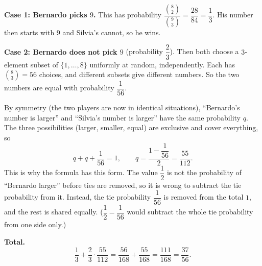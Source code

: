 \textbf{Case 1: Bernardo picks $9$.} This has probability $\dfrac{\binom82}{\binom93}=\dfrac{28}{84}=\dfrac{1}{3}$. His number then starts with $9$ and Silvia's cannot, so he wins.

\textbf{Case 2: Bernardo does not pick $9$} (probability $\dfrac{2}{3}$). Then both choose a $3$-element subset of $\{1,\dots,8\}$ uniformly at random, independently. Each has $\binom83=56$ choices, and different subsets give different numbers. So the two numbers are equal with probability $\dfrac{1}{56}$.

By symmetry (the two players are now in identical situations), ``Bernardo's number is larger'' and ``Silvia's number is larger'' have the same probability $q$. The three possibilities (larger, smaller, equal) are exclusive and cover everything, so
\[
q+q+\dfrac{1}{56}=1,\qquad q=\dfrac{1-\dfrac{1}{56}}{2}=\dfrac{55}{112}.
\]
This is why the formula has this form. The value $\dfrac{1}{2}$ is not the probability of ``Bernardo larger'' before ties are removed, so it is wrong to subtract the tie probability from it. Instead, the tie probability $\dfrac{1}{56}$ is removed from the total $1$, and the rest is shared equally. ($\dfrac{1}{2}-\dfrac{1}{56}$ would subtract the whole tie probability from one side only.)

\textbf{Total.}
\[
\dfrac{1}{3}+\dfrac{2}{3}\cdot\dfrac{55}{112}=\dfrac{56}{168}+\dfrac{55}{168}=\dfrac{111}{168}=\boxed{\dfrac{37}{56}}.
\]
